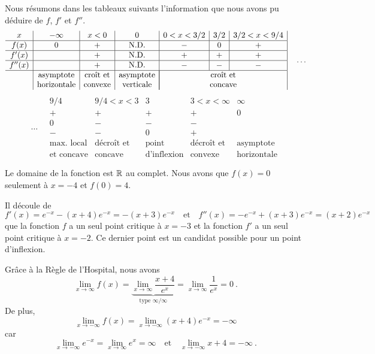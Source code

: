 {Nous résumons dans les tableaux suivants l'information que nous avons pu
déduire de $f$, $f'$ et $f''$.
\[
\begin{array}{c|c|c|c|c|c|c|}
x & -\infty & x<0 & 0 & 0<x<3/2 & 3/2 & 3/2<x<9/4 \\
\hline
f(x) & 0 & + & \text{N.D.} & - & 0 & + \\
\hline
f'(x) & & + & \text{N.D.} & + & + & + \\
\hline
f''(x) & & + & \text{N.D.} & - & - & - \\
\hline
& \text{asymptote} & \text{croît et} & \text{asymptote} &
\multicolumn{3}{|c|}{\text{croît et}} \\
& \text{horizontale} & \text{convexe} & \text{verticale} &
\multicolumn{3}{|c|}{\text{concave}}
\end{array} \quad \ldots
\]
\[
\ldots \quad 
\begin{array}{|c|c|c|c|c}
9/4 & 9/4<x<3 & 3 & 3<x<\infty & \infty \\
\hline
+ & + & + & + & 0 \\
\hline
0 & - & - & - & \\
\hline
- & - & 0 & + & \\
\hline
\text{max. local} & \text{décroît et} & \text{point} &
\text{décroît et} & \text{asymptote} \\
\text{et concave} & \text{concave} & \text{d'inflexion} &
\text{convexe} & \text{horizontale}
\end{array}
\]

 Le domaine de la fonction est $\mathbb{R}$ au complet.
Nous avons que $f(x)=0$ seulement à $x=-4$ et $f(0) = 4$.

Il découle de
\[
f'(x) = e^{-x}-(x+4)e^{-x} = -(x+3)e^{-x} \quad \text{et} \quad
f''(x) = -e^{-x} + (x+3)e^{-x} = (x+2)e^{-x}
\]
que la fonction $f$ a un seul point critique à $x=-3$ et la fonction $f'$
a un seul point critique à $x=-2$.  Ce dernier point est un candidat
possible pour un point d'inflexion.

Grâce à la Règle de l'Hospital, nous avons
\[
\lim_{x\rightarrow \infty} f(x)
= \underbrace{\lim_{x\rightarrow \infty} \frac{x+4}{e^x}
}_{\text{type }\infty/\infty}
= \lim_{x\rightarrow \infty} \frac{1}{e^x} = 0 \ .
\]
De plus,
\[
\lim_{x\rightarrow -\infty} f(x) = \lim_{x\rightarrow -\infty} (x+4)e^{-x}
= -\infty
\]
car
\[
\lim_{x\rightarrow -\infty} e^{-x} = \lim_{x\rightarrow \infty} e^x
= \infty \quad \text{et} \quad
\lim_{x\rightarrow -\infty} x+4 = -\infty \ .
\]

}
